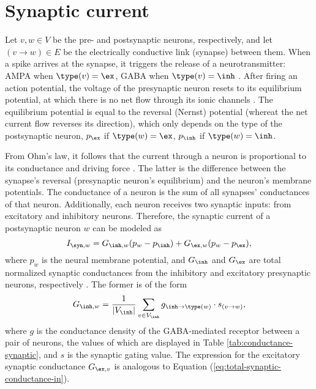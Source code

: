 \section{Synaptic current}
\label{sec:synaptic-current}

Let $v, w \in V$ be the pre- and postsynaptic neurons, respectively, and let $(v \to w) \in E$ be the electrically conductive link (synapse) between them. When a spike arrives at the synapse, it triggers the release of a neurotransmitter: AMPA when $\type(v) = \ex$, GABA when $\type(v) = \inh$ \cite{Lowet2015}. After firing an action potential, the voltage of the presynaptic neuron resets to its equilibrium potential, at which there is no net flow through its ionic channels \cite{JohnsBook2014:6}. The equilibrium potential is equal to the reversal (Nernst) potential (whereat the net current flow reverses its direction), which only depends on the type of the postsynaptic neuron, $p_\ex$ if $\type(w) = \ex$, $p_\inh$ if $\type(w) = \inh$. 

From Ohm's law, it follows that the current through a neuron is proportional to its conductance and driving force \cite{KandelBook2003:6}. The latter is the difference between the synapse's reversal (presynaptic neuron's equilibrium) and the neuron's membrane potentials. The conductance of a neuron is the sum of all synapses' conductances of that neuron. Additionally, each neuron receives two synaptic inputs: from excitatory and inhibitory neurons. Therefore, the synaptic current of a postsynaptic neuron $w$ can be modeled as
\begin{equation}
    I_{\syn, w} = G_{\inh, w} (p_{w} - p_{\inh}) + G_{\ex, w} (p_{w} - p_{\ex}),
    \label{eq:synaptic-current}
\end{equation}
where $p_w$ is the neural membrane potential, and $G_{\inh}$ and $G_{\ex}$ are total normalized synaptic conductances from the inhibitory and excitatory presynaptic neurons, respectively \cite{Jensen2005}. The former is of the form 
\begin{equation}
    G_{\inh, w} = \frac{1}{|V_\inh|} \sum_{v \in V_\inh} g_{\inh \to \type(w)} \cdot s_{(v \to w)},
    \label{eq:total-synaptic-conductance-in}
\end{equation}
where $g$ is the conductance density of the GABA-mediated receptor between a pair of neurons, the values of which are displayed in Table \ref{tab:conductance-synaptic}, and $s$ is the synaptic gating value. The expression for the excitatory synaptic conductance $G_{\ex, v}$ is analogous to Equation (\ref{eq:total-synaptic-conductance-in}).

